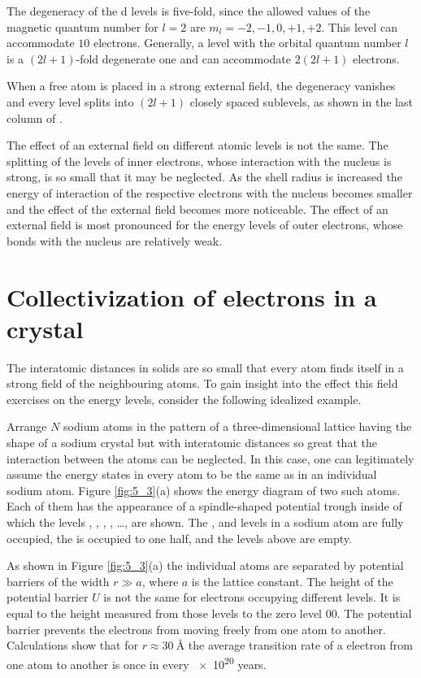 The degeneracy of the d levels is five-fold, since the allowed values of the magnetic quantum number for $l=2$ are $m_l=-2, -1, 0, +1, +2$. This level can accommodate $10$ electrons. Generally, a level with the orbital quantum number $l$ is a $(2l+1)$-fold degenerate one and can accommodate $2(2l+1)$ electrons.

When a free atom is placed in a strong external field, the degeneracy vanishes and every level splits into $(2l+1)$ closely spaced sublevels, as shown in the last column of .

The effect of an external field on different atomic levels is not the same. The splitting of the levels of inner electrons, whose interaction with the nucleus is strong, is so small that it may be neglected. As the shell radius is increased the energy of interaction of the respective electrons with the nucleus becomes smaller and the effect of the external field becomes more noticeable. The effect of an external field is most pronounced for the energy levels of outer electrons, whose bonds with the nucleus are relatively weak.

\section{Collectivization of electrons in a crystal}\label{sec:38}

The interatomic distances in solids are so small that every atom finds itself in a strong field of the neighbouring atoms. To gain insight into the effect this field exercises on the energy levels, consider
the following idealized example.

Arrange $N$ sodium atoms in the pattern of a three-dimensional lattice having the shape of a sodium crystal but with interatomic distances so great that the interaction between the atoms can be neglected. In this case, one can legitimately assume the energy states in every atom to be the same as in an individual sodium atom. Figure \ref{fig:5_3}(a) shows the energy diagram of two such atoms. Each of them has the appearance of a spindle-shaped potential trough inside of which the levels , , , , \ldots, are shown. The ,  and  levels in a sodium atom are fully occupied, the  is occupied to one half, and the levels above  are empty.

As shown in Figure \ref{fig:5_3}(a) the individual atoms are separated by potential barriers of the width $r\gg a$, where $a$ is the lattice constant. The height of the potential barrier $U$ is not the same for electrons occupying different levels. It is equal to the height measured from those levels to the zero level $00$. The potential barrier prevents the electrons from moving freely from one atom to another. Calculations show that for $r\approx\SI{30}{\angstrom}$ the average transition rate of a  electron from one atom to another is once in every \num{e20} years.

